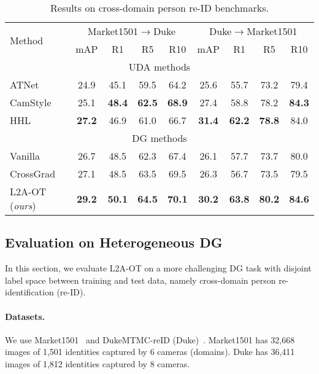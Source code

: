 \documentclass[runningheads]{llncs}
\begin{document}
\begin{table}[t]
\tabstyle{5pt}
\begin{tabular}{l | c c c c | c c c c}
\hline
\multirow{2}{*}{Method} & \multicolumn{4}{c|}{Market1501$\to$Duke} & \multicolumn{4}{c}{Duke$\to$Market1501} \\
 & mAP & R1 & R5 & R10 & mAP & R1 & R5 & R10 \\
\hline
\multicolumn{9}{c}{UDA methods} \\
\hline
ATNet~\cite{liu2019adaptive} & 24.9 & 45.1 & 59.5 & 64.2 & 25.6 & 55.7 & 73.2 & 79.4 \\
CamStyle~\cite{zhong2019camstyle} & 25.1 & \textbf{48.4} & \textbf{62.5} & \textbf{68.9} & 27.4 & 58.8 & 78.2 & \textbf{84.3} \\
HHL~\cite{zhong2018gen} & \textbf{27.2} & 46.9 & 61.0 & 66.7 & \textbf{31.4} & \textbf{62.2} & \textbf{78.8} & 84.0 \\
\hline
\multicolumn{9}{c}{DG methods} \\
\hline
Vanilla & 26.7 & 48.5 & 62.3 & 67.4 & 26.1 & {57.7} & 73.7 & {80.0} \\
CrossGrad~\cite{shankar2018generalizing} & 27.1 & 48.5 & 63.5 & {69.5} & {26.3} & 56.7 & 73.5 & 79.5 \\
L2A-OT (\emph{ours}) & \textbf{29.2} & \textbf{50.1} & \textbf{64.5} & \textbf{70.1} & \textbf{30.2} & \textbf{63.8} & \textbf{80.2} & \textbf{84.6} \\
\hline
\end{tabular}
\caption{Results on cross-domain person re-ID benchmarks.}
\label{tab:resOnXdomReID}
\end{table}

\subsection{Evaluation on Heterogeneous DG}
In this section, we evaluate L2A-OT on a more challenging DG task with disjoint label space between training and test data, namely cross-domain person re-identification (re-ID).

\paragraph{Datasets.}
We use Market1501~\cite{zheng2015scalable} and DukeMTMC-reID (Duke)~\cite{ristani2016perform,zheng2017unlabeled}. Market1501 has 32,668 images of 1,501 identities captured by 6 cameras (domains). Duke has 36,411 images of 1,812 identities captured by 8 cameras.
\end{document}
